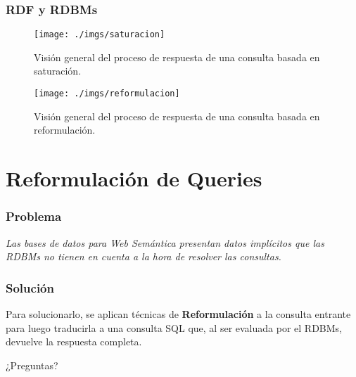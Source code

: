 \documentclass{beamer}
\begin{document}
\begin{frame}
\frametitle{RDF y RDBMs}

\begin{figure}[h]
\begin{center}
\texttt{[image: ./imgs/saturacion]}
\caption{Visión general del proceso de respuesta de una consulta basada en saturación.}
\end{center}
\end{figure}

\begin{figure}[H]
\begin{center}
\texttt{[image: ./imgs/reformulacion]}
\caption{Visión general del proceso de respuesta de una consulta basada en reformulación.}
\end{center}
\end{figure}
\end{frame}

\section{Reformulación de Queries}
\begin{frame}
\frametitle{Problema}
\centering
\textit{Las bases de datos para Web Semántica presentan datos implícitos que las RDBMs no tienen en cuenta a la hora de resolver las consultas.}
\end{frame}	

\begin{frame}
\frametitle{Solución}
Para solucionarlo, se aplican técnicas de \textbf{Reformulación} a la consulta entrante para luego traducirla a una consulta SQL que, al ser evaluada por el RDBMs, devuelve la respuesta completa.
\end{frame}	



\begin{frame}
\Huge{\centerline{¿Preguntas?}}
\end{frame}

\end{document}
